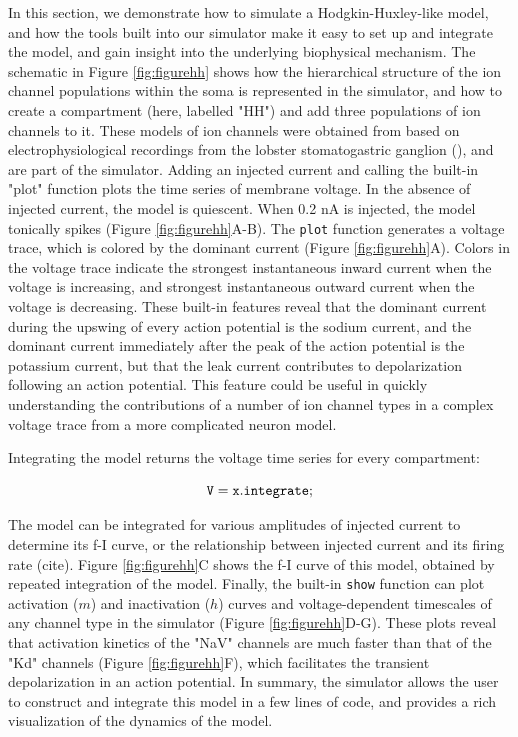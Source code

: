 \documentclass{frontiersSCNS} %
\begin{document}
In this section, we demonstrate how to simulate a Hodgkin-Huxley-like model, and how the tools built into our simulator make it easy to set up and integrate the model, and gain insight into the underlying biophysical mechanism. The schematic in Figure \ref{fig:figurehh} shows how the hierarchical structure of the ion channel populations within the soma is represented in the simulator, and how to create a compartment (here, labelled "HH") and add three populations of ion channels to it. These models of ion channels were obtained from \cite{liuModelNeuronActivitydependent1998} based on electrophysiological recordings from the lobster stomatogastric ganglion (\cite{turrigianoSelectiveRegulationCurrent1995}), and are part of the simulator. Adding an injected current and calling the built-in "plot" function plots the time series of membrane voltage. In the absence of injected current, the model is quiescent. When 0.2 nA is injected, the model tonically spikes (Figure \ref{fig:figurehh}A-B).  The \texttt{plot} function generates a voltage trace, which is colored by the dominant current (Figure \ref{fig:figurehh}A). Colors in the voltage trace indicate the strongest instantaneous inward current when the voltage is increasing, and strongest instantaneous outward current when the voltage is decreasing. These built-in features reveal that the dominant current during the upswing of every action potential is the sodium current, and the dominant current immediately after the peak of the action potential is the potassium current, but that the leak current contributes to depolarization following an action potential. This feature could be useful in quickly understanding the contributions of a number of ion channel types in a complex voltage trace from a more complicated neuron model. 

Integrating the model returns the voltage time series for every compartment: 

\begin{equation}
{\tt V = x.integrate;}
\end{equation}

The model can be integrated for various amplitudes of injected current to determine its f-I curve, or the relationship between injected current and its firing rate (cite). Figure \ref{fig:figurehh}C shows the f-I curve of this model, obtained by repeated integration of the model.  Finally, the built-in \texttt{show} function can plot activation ($m$) and inactivation ($h$) curves and voltage-dependent timescales of any channel type in the simulator (Figure \ref{fig:figurehh}D-G). These plots reveal that activation kinetics of the "NaV" channels are much faster than that of the "Kd" channels (Figure \ref{fig:figurehh}F), which facilitates the transient depolarization in an action potential. In summary, the simulator allows the user to construct and integrate this model in a few lines of code, and provides a rich visualization of the dynamics of the model. 
\end{document}
